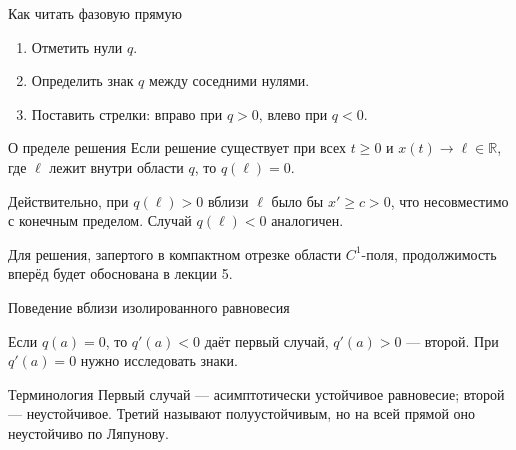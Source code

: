 \documentclass[aspectratio=169,11pt]{beamer}
\newcommand{\R}{\mathbb R}
\begin{document}
\begin{frame}{Как читать фазовую прямую}
\begin{enumerate}
\item Отметить нули $q$.
\item Определить знак $q$ между соседними нулями.
\item Поставить стрелки: вправо при $q>0$, влево при $q<0$.
\end{enumerate}
\begin{block}{О пределе решения}
Если решение существует при всех $t\ge0$ и $x(t)\to\ell\in\R$,
где $\ell$ лежит внутри области $q$, то $q(\ell)=0$.
\end{block}
Действительно, при $q(\ell)>0$ вблизи $\ell$ было бы $x'\ge c>0$,
что несовместимо с конечным пределом. Случай $q(\ell)<0$ аналогичен.
\medskip

Для решения, запертого в компактном отрезке области $C^1$-поля,
продолжимость вперёд будет обоснована в лекции 5.
\end{frame}

\begin{frame}{Поведение вблизи изолированного равновесия}
\begin{center}
\end{center}
Если $q(a)=0$, то $q'(a)<0$ даёт первый случай,
$q'(a)>0$ --- второй. При $q'(a)=0$ нужно исследовать знаки.
\begin{block}{Терминология}
Первый случай --- асимптотически устойчивое равновесие;
второй --- неустойчивое. Третий называют полуустойчивым,
но на всей прямой оно неустойчиво по Ляпунову.
\end{block}
\end{frame}
\end{document}
